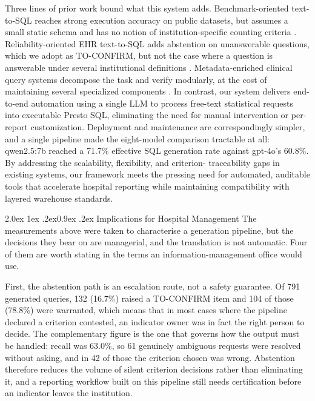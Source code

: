 \documentclass[10pt]{article}
\makeatletter
\renewcommand\subsection{\@startsection{subsection}{2}{\z@}%
  {2.0ex \@plus 1ex \@minus .2ex}{0.9ex \@plus .2ex}%
  {\normalfont\normalsize\bfseries}}
\makeatother
\begin{document}
Three lines of prior work bound what this system adds. Benchmark-oriented text-to-SQL reaches strong execution accuracy on public datasets, but assumes a small static schema and has no notion of institution-specific counting criteria \cite{yu2018,guo2019,bogin2019,tsqlsurvey2024}. Reliability-oriented EHR text-to-SQL adds abstention on unanswerable questions, which we adopt as TO-CONFIRM, but not the case where a question is answerable under several institutional definitions \cite{ehrsql2024}. Metadata-enriched clinical query systems decompose the task and verify modularly, at the cost of maintaining several specialized components \cite{metaclin2025,sqlthought2025}. In contrast, our system delivers end-to-end
automation using a single LLM to process free-text statistical requests into
executable Presto SQL, eliminating the need for manual intervention or
per-report customization. Deployment and maintenance are correspondingly simpler, and a single pipeline made the eight-model comparison tractable at all: qwen2.5:7b reached a 71.7\% effective SQL generation rate against gpt-4o's 60.8\%. By addressing the scalability, flexibility, and criterion-
traceability gaps in existing systems, our framework meets the pressing need for
automated, auditable tools that accelerate hospital reporting while maintaining
compatibility with layered warehouse standards.

\subsection{Implications for Hospital Management}\label{sec:mgmt}
The measurements above were taken to characterise a generation pipeline, but the
decisions they bear on are managerial, and the translation is not automatic. Four
of them are worth stating in the terms an information-management office would use.

First, the abstention path is an escalation route, not a safety guarantee. Of 791
generated queries, 132 (16.7\%) raised a TO-CONFIRM item and 104 of those
(78.8\%) were warranted, which means that in most cases where the pipeline
declared a criterion contested, an indicator owner was in fact the right person to
decide. The complementary figure is the one that governs how the output must be
handled: recall was 63.0\%, so 61 genuinely ambiguous requests were resolved
without asking, and in 42 of those the criterion chosen was wrong. Abstention
therefore reduces the volume of silent criterion decisions rather than eliminating
it, and a reporting workflow built on this pipeline still needs certification
before an indicator leaves the institution.
\end{document}
